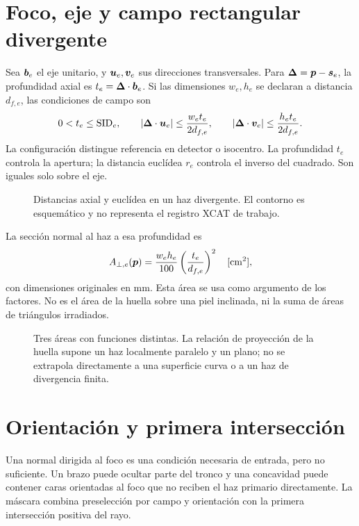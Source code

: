 \section{Foco, eje y campo rectangular divergente}
Sea $\bm{b}_e$ el eje unitario, y $\bm{u}_e,\bm{v}_e$ sus direcciones transversales. Para $\bm{\Delta}=\bm{p}-\bm{s}_e$, la profundidad axial es $t_e=\bm{\Delta}\cdot\bm{b}_e$. Si las dimensiones $w_e,h_e$ se declaran a distancia $d_{f,e}$, las condiciones de campo son
\begin{equation}\label{eq:field}
0<t_e\leq\mathrm{SID}_e,\qquad
|\bm{\Delta}\cdot\bm{u}_e|\leq\frac{w_e t_e}{2d_{f,e}},\qquad
|\bm{\Delta}\cdot\bm{v}_e|\leq\frac{h_e t_e}{2d_{f,e}}.
\end{equation}
La configuración distingue referencia en detector o isocentro. La profundidad $t_e$ controla la apertura; la distancia euclídea $r_e$ controla el inverso del cuadrado. Son iguales solo sobre el eje.
\begin{figure}[htbp]\centering\resizebox{.96\textwidth}{!}{}
\caption{Distancias axial y euclídea en un haz divergente. El contorno es esquemático y no representa el registro XCAT de trabajo.}\end{figure}

La sección normal al haz a esa profundidad es
\begin{equation}
A_{\perp,e}(\bm{p})=\frac{w_e h_e}{100}\left(\frac{t_e}{d_{f,e}}\right)^2\quad[\mathrm{cm^2}],
\end{equation}
con dimensiones originales en mm. Esta área se usa como argumento de los factores. No es el área de la huella sobre una piel inclinada, ni la suma de áreas de triángulos irradiados.



\begin{figure}[htbp]\centering
\caption{Tres áreas con funciones distintas. La relación de proyección de la huella supone un haz localmente paralelo y un plano; no se extrapola directamente a una superficie curva o a un haz de divergencia finita.}\label{fig:areas_campo}\end{figure}

\section{Orientación y primera intersección}
Una normal dirigida al foco es una condición necesaria de entrada, pero no suficiente. Un brazo puede ocultar parte del tronco y una concavidad puede contener caras orientadas al foco que no reciben el haz primario directamente. La máscara combina preselección por campo y orientación con la primera intersección positiva del rayo.

